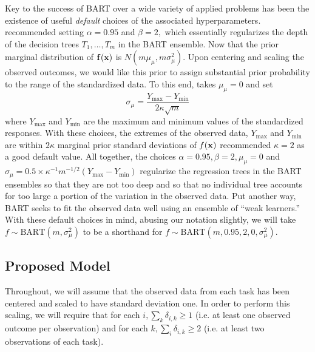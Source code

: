 \documentclass[12pt]{article}
\begin{document}
Key to the success of BART over a wide variety of applied problems has been the existence of useful \textit{default} choices of the associated hyperparameters.
\citet{Chipman2010} recommended setting $\alpha = 0.95$ and $\beta = 2,$ which essentially regularizes the depth of the decision trees $T_{1}, \ldots, T_{m}$ in the BART ensemble.
Now that the prior marginal distribution of $\mathbf{f}(\mathbf{x})$ is $N(m\mu_{\mu}, m\sigma^{2}_{\mu}).$
Upon centering and scaling the observed outcomes, we would like this prior to assign substantial prior probability to the range of the standardized data.
To this end, \citet{Chipman2010} takes $\mu_{\mu} = 0$ and set 
$$
\sigma_{\mu} = \frac{Y_{\max} - Y_{\min}}{2\kappa\sqrt{m}}
$$
where $Y_{\max}$ and $Y_{\min}$ are the maximum and minimum values of the standardized responses.
With these choices, the extremes of the observed data, $Y_{\max}$ and $Y_{\min}$ are within $2\kappa$ marginal prior standard deviations of $f(\mathbf{x})$
\citet{Chipman2010} recommended $\kappa = 2$ as a good default value.
All together, the choices $\alpha = 0.95, \beta = 2, \mu_{\mu} = 0$ and $\sigma_{\mu} = 0.5 \times \kappa^{-1}m^{-1/2}(Y_{\max} - Y_{\min})$ regularize the regression trees in the BART ensembles so that they are not too deep and so that no individual tree accounts for too large a portion of the variation in the observed data. 
Put another way, BART seeks to fit the observed data well using an ensemble of ``weak learners.''
With these default choices in mind, abusing our notation slightly, we will take $f \sim \text{BART}(m, \sigma^{2}_{\mu})$ to be a shorthand for $f \sim \text{BART}(m, 0.95, 2, 0, \sigma^{2}_{\mu}).$


\subsection{Proposed Model}

Throughout, we will assume that the observed data from each task has been centered and scaled to have standard deviation one.
In order to perform this scaling, we will require that for each $i, \sum_{k}{\delta_{i,k}} \geq 1$ (i.e. at least one observed outcome per observation) and for each $k, \sum_{i}{\delta_{i,k}} \geq 2$ (i.e. at least two observations of each task).
\end{document}
